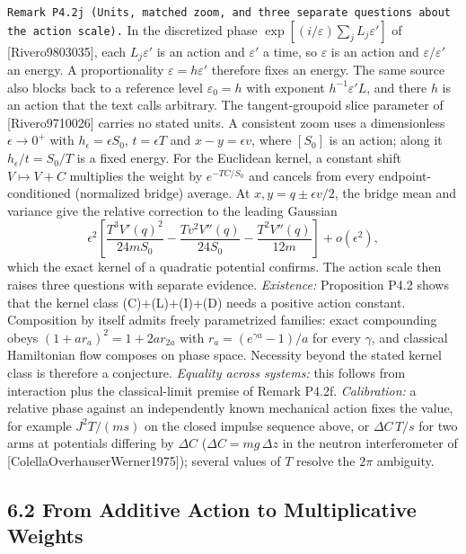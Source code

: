 \documentclass[
]{article}
\begin{document}
\texttt{Remark\ P4.2j\ (Units,\ matched\ zoom,\ and\ three\ separate\ questions\ about\ the\ action\ scale).}
In the discretized phase \(\exp[(i/\varepsilon)\sum_jL_j\varepsilon']\)
of {[}Rivero9803035{]}, each \(L_j\varepsilon'\) is an action and
\(\varepsilon'\) a time, so \(\varepsilon\) is an action and
\(\varepsilon/\varepsilon'\) an energy. A proportionality
\(\varepsilon=h\varepsilon'\) therefore fixes an energy. The same source
also blocks back to a reference level \(\varepsilon_0=h\) with exponent
\(h^{-1}\varepsilon'L\), and there \(h\) is an action that the text
calls arbitrary. The tangent-groupoid slice parameter of
{[}Rivero9710026{]} carries no stated units. A consistent zoom uses a
dimensionless \(\epsilon\to0^+\) with \(h_\epsilon=\epsilon S_0\),
\(t=\epsilon T\) and \(x-y=\epsilon v\), where \([S_0]\) is an action;
along it \(h_\epsilon/t=S_0/T\) is a fixed energy. For the Euclidean
kernel, a constant shift \(V\mapsto V+C\) multiplies the weight by
\(e^{-TC/S_0}\) and cancels from every endpoint-conditioned (normalized
bridge) average. At \(x,y=q\pm\epsilon v/2\), the bridge mean and
variance give the relative correction to the leading Gaussian \[
\epsilon^2\left[\frac{T^3V'(q)^2}{24mS_0}-\frac{Tv^2V''(q)}{24S_0}-\frac{T^2V''(q)}{12m}\right]+o(\epsilon^2),
\] which the exact kernel of a quadratic potential confirms. The action
scale then raises three questions with separate evidence.
\emph{Existence:} Proposition P4.2 shows that the kernel class
(C)+(L)+(I)+(D) needs a positive action constant. Composition by itself
admits freely parametrized families: exact compounding obeys
\((1+ar_a)^2=1+2ar_{2a}\) with \(r_a=(e^{\gamma a}-1)/a\) for every
\(\gamma\), and classical Hamiltonian flow composes on phase space.
Necessity beyond the stated kernel class is therefore a conjecture.
\emph{Equality across systems:} this follows from interaction plus the
classical-limit premise of Remark P4.2f. \emph{Calibration:} a relative
phase against an independently known mechanical action fixes the value,
for example \(J^2T/(ms)\) on the closed impulse sequence above, or
\(\Delta C\,T/s\) for two arms at potentials differing by \(\Delta C\)
(\(\Delta C=mg\,\Delta z\) in the neutron interferometer of
{[}ColellaOverhauserWerner1975{]}); several values of \(T\) resolve the
\(2\pi\) ambiguity.

\subsection{6.2 From Additive Action to Multiplicative
Weights}\label{from-additive-action-to-multiplicative-weights}
\end{document}
